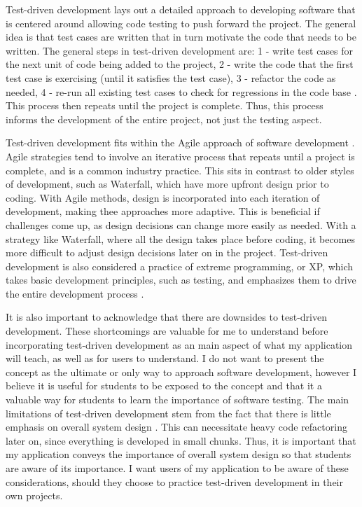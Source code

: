 \documentclass[10pt,twocolumn]{article}
\begin{document}
Test-driven development lays out a detailed approach to developing software that is centered around allowing 
code testing to push forward the project. The general idea is that test cases are written that in turn motivate the code 
that needs to be written. The general steps in test-driven development are: 1 - write test cases for the next unit of 
code being added to the project, 2 - write the code that the first test case is exercising (until it satisfies the test 
case), 3 - refactor the code as needed, 4 - re-run all existing test cases to check for regressions in the code base 
\cite{Bhat2006Article}. This process then repeats until the project is complete. Thus, this process informs the 
development of the entire project, not just the testing aspect. 

Test-driven development fits within the Agile approach of software development \cite{Janzen2005Article}. Agile 
strategies tend to involve an iterative process that repeats until a project is complete, and is a common industry 
practice. This sits in contrast to older styles of development, such as Waterfall, which have more upfront design 
prior to coding. With Agile methods, design is incorporated into each iteration of development, making thee approaches 
more adaptive. This is beneficial if challenges come up, as design decisions can change more easily as 
needed. With a strategy like Waterfall, where all the design takes place before coding, it becomes more difficult to 
adjust design decisions later on in the project. Test-driven development is also considered a practice of extreme 
programming, or XP, which takes basic development principles, such as testing, and emphasizes them to drive the entire 
development process \cite{Desai2008Article}. 

It is also important to acknowledge that there are downsides to test-driven development. These shortcomings are valuable 
for me to understand before incorporating test-driven 
development as an main aspect of what my application will teach, as well as for users to understand. I do not want to 
present the concept as the ultimate or only way to approach software development, however I believe it is useful for 
students to be exposed to the concept and that it a valuable way for students to learn the importance of software testing. The main 
limitations of test-driven development stem from the fact that there is little emphasis on overall system design 
\cite{George2004Article}. This can necessitate heavy code refactoring later on, since everything is developed in small 
chunks. Thus, it is important that my application conveys the importance of overall system design so that students are 
aware of its importance. I want users of my application to be aware of these considerations, should they choose to practice test-driven 
development in their own projects. 
\end{document}
